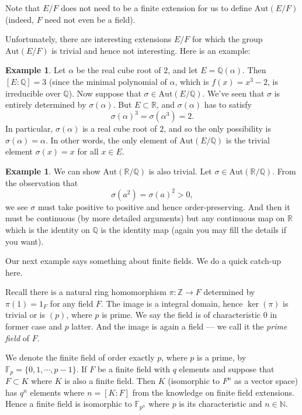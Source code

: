\documentclass[12pt]{report}
\theoremstyle{definition}
\newtheorem{example}[thm]{Example}
\def\ZZ{\mathbb{Z}}
\def\NN{\mathbb{N}}
\def\QQ{\mathbb{Q}}
\def\RR{\mathbb{R}}
\def\FF{\mathbb{F}}
\def\Aut{\text{Aut}}
\def\aa{\alpha}
\begin{document}
Note that $E/F$ does not need to be a finite extension for us to define $\Aut(E/F)$ (indeed, $F$ need not even be a field).

Unfortunately, there are interesting extensions $E/F$ for which the group $\Aut(E/F)$ is trivial and hence not interesting. Here is an example:

\begin{example}
    Let $\aa$ be the real cube root of $2$, and let $E = \QQ(\aa)$. Then $[E:\QQ] = 3$ (since the minimal polynomial of $\aa$, which is $f(x) = x^3 - 2$, is irreducible over $\QQ$). Now suppose that $\sigma \in \Aut(E/\QQ)$. We've seen that $\sigma$ is entirely determined by $\sigma(\aa)$. But $E \subset \RR$, and $\sigma(\aa)$ has to satisfy $$\sigma(\aa)^3 = \sigma(\aa^3) = 2.$$
    In particular, $\sigma(\aa)$ is a real cube root of $2$, and so the only possibility is $\sigma(\aa) = \aa$. In other words, the only element of $\Aut(E/\QQ)$ is the trivial element $\sigma(x) = x$ for all $x \in E$.
\end{example}

\begin{example}
    We can show $\Aut(\RR/\QQ)$ is also trivial. Let $\sigma\in \Aut(\RR/\QQ)$. From the observation that $$\sigma(a^2)=\sigma(a)^2 > 0,$$ we see $\sigma$ must take positive to positive and hence order-preserving. And then it must be continuous (by more detailed arguments) but any continuous map on $\RR$ which is the identity on $\QQ$ is the identity map (again you may fill the details if you want).
\end{example}

\noindent Our next example says something about finite fields. We do a quick catch-up here.

Recall there is a natural ring homomorphism $\pi:\ZZ\to F$ determined by $\pi(1)=1_F$ for any field $F$. The image is a integral domain, hence $\ker(\pi)$ is trivial or is $(p)$, where $p$ is prime. We say the field is of characteristic 0 in former case and $p$ latter. And the image is again a field --- we call it the \emph{prime field} of $F$.

We denote the finite field of order exactly $p$, where $p$ is a prime, by $\FF_p=\{0,1,\cdots,p-1\}$. If $F$ be a finite field with $q$ elements and suppose that $F \subset K$ where $K$ is also a finite field. Then $K$ (isomorphic to $F^n$ as a vector space) has $q^n$ elements where $n = [K:F]$ from the knowledge on finite field extensions. Hence a finite field is isomorphic to $\FF_{p^n}$ where $p$ is its characteristic and $n\in \NN$.
\end{document}
